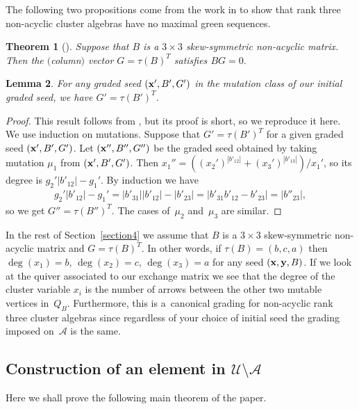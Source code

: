 \documentclass[11pt]{article}
\numberwithin{equation}{section}
\newtheorem{Theorem}{Theorem}[section]
\newtheorem{Lemma}[Theorem]{Lemma}
\begin{document}
The following two propositions come from the work in \cite{S1} to show that rank three non-acyclic cluster algebras have no maximal green sequences.
\begin{Theorem}[]
Suppose that $B$ is a $3\times 3$ skew-symmetric non-acyclic matrix. Then the $($column$)$ vector $G=\tau(B)^T$ satisfies $BG=0.$
\end{Theorem}

\begin{Lemma}\label{lemma: grading}
For any graded seed $({\bf x}',B',G')$ in the mutation class of our initial graded seed, we have $G'= \tau(B')^T$.
\end{Lemma}

\begin{proof}
This result follows from \cite[Lemma~2.3]{S1}, but its proof is short, so we reproduce it here. We use induction on mutations. Suppose that $G'= \tau(B')^T$ for a given graded seed $({\bf x}',B',G')$. Let $({\bf x}'',B'',G'')$ be the graded seed obtained by taking mutation $\mu_1$ from $({\bf x}',B',G')$.  Then $x_1''=((x_2')^{|b'_{12}|}+(x_3')^{|b'_{13}|})/x_1'$, so its degree is $g_2' |b'_{12}|-g_1'$. By induction we have
\begin{gather*}
g_2' |b'_{12}|-g_1' =|b'_{31}| |b'_{12}|-|b'_{23}| = |b'_{31}b'_{12}-b'_{23}| =|b''_{23}|,
\end{gather*}
so we get $G''= \tau(B'')^T$. The cases of~$\mu_2$ and~$\mu_3$ are similar.
\end{proof}


In the rest of Section~\ref{section4} we assume that $B$ is a $3\times 3$ skew-symmetric non-acyclic matrix and $G=\tau(B)^T$. In other words, if $\tau(B)=(b,c,a)$ then $\deg(x_1)=b$, $\deg(x_2)=c$, $\deg(x_3)=a$ for any seed $({\bf x}, {\bf y}, B)$. If we look at the quiver associated to our exchange matrix we see that the degree of the cluster variable $x_i$ is the number of arrows between the other two mutable vertices in~$Q_B$. Furthermore, this is a~canonical grading for non-acyclic rank three cluster algebras since regardless of your choice of initial seed the grading imposed on~$\mathcal{A}$ is the same.

\subsection[Construction of an element in $\mathcal{U}\setminus\mathcal{A}$]{Construction of an element in $\boldsymbol{\mathcal{U}\setminus\mathcal{A}}$}\label{section4.3}
Here we shall prove the following main theorem of the paper.
\end{document}
